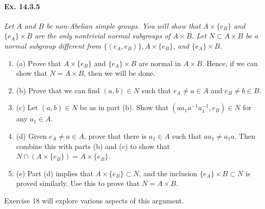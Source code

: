 \documentclass[11pt,a4paper]{article}
\newcommand{\be} {\begin{enumerate}}
\newcommand{\ee} {\end{enumerate}}
\begin{document}
\paragraph{Ex. 14.3.5}{\it Let $A$ and $B$ be non-Abelian simple groups. You will show that $A \times \{e_B\}$ and $\{e_A\}\times B$ are the only nontrivial normal subgroups of $A \times B$. Let $N \subset A \times B$ be a normal subgroup different from $\{(e_A,e_B)\},A \times\{e_B\}$, and $\{e_A\} \times B$.
\be
\item[(a)] Prove that $A \times\{e_B\}$ and $\{e_A\}\times B$ are normal in $A \times B$. Hence, if we can show that $N = A\times B$, then we will be done.
\item[(b)] Prove that we can find $(a,b)\in N$ such that $e_A \ne a \in A$ and $e_B \ne b\in B$.
\item[(c)] Let $(a,b)\in N$ be as in part (b). Show that $(aa_1a^{-1}a_1^{-1}, e_B) \in N$ for any $a_1 \in A$.
\item[(d)] Given $e_A\ne a \in A$, prove that there is $a_1\in A$ such that $aa_1\ne a_1a$. Then combine this with parts (b) and (c) to show that $N\cap(A\times\{e_B\}) = A \times\{e_B\}$.
\item[(e)] Part (d) implies that $A \times \{e_B\} \subset N$, and the inclusion $\{e_A\} \times B \subset N$ is proved similarly. Use this to prove that $N = A\times B$.
\ee
Exercise 18 will explore various aspects of this argument.
}
\end{document}
